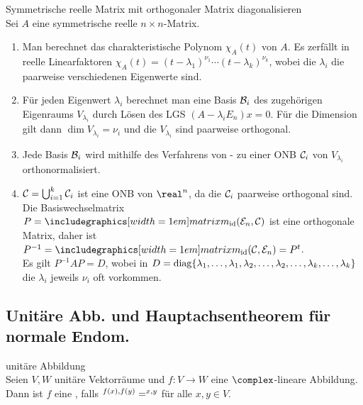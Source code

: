 \begin{Prozedur}%
{Symmetrische reelle Matrix mit orthogonaler Matrix diagonalisieren} \\
    Sei $A$ eine symmetrische reelle $n \times n$-Matrix.
    \begin{enumerate}
        \item Man berechnet das charakteristische Polynom $\chi_A(t)$ von $A$.
        Es zerfällt in reelle Linearfaktoren
        $\chi_A(t) = (t - \lambda_1)^{\nu_1} \cdots (t - \lambda_k)^{\nu_k}$,
        wobei die $\lambda_i$ die paarweise verschiedenen Eigenwerte sind.
        
        \item Für jeden Eigenwert $\lambda_i$ berechnet man eine Basis
        $\mathcal{B}_i$ des zugehörigen Eigenraums $V_{\lambda_i}$ durch Lösen
        des LGS $(A - \lambda_i E_n)x = 0$.
        Für die Dimension gilt dann $\dim V_{\lambda_i} = \nu_i$ und die
        $V_{\lambda_i}$ sind paarweise orthogonal.
        
        \item Jede Basis $\mathcal{B}_i$ wird mithilfe des Verfahrens
        von - zu einer ONB $\mathcal{C}_i$ von
        $V_{\lambda_i}$ orthonormalisiert.
        
        \item $\mathcal{C} = \bigcup_{i=1}^k \mathcal{C}_i$ ist eine ONB von
        $\real^n$, da die $\mathcal{C}_i$ paarweise orthogonal sind.
        Die Basiswechselmatrix $P = \matrixm_{\id}(\basis{E}_n, \basis{C})$
        ist eine orthogonale Matrix, daher ist
        $P^{-1} = \matrixm_{\id}(\basis{C}, \basis{E}_n) = P^t$. \\
        Es gilt $P^{-1} A P = D$, wobei in
        $D = \operatorname{diag}\{\lambda_1, \ldots, \lambda_1, \lambda_2, \ldots,
        \lambda_2, \ldots, \lambda_k, \ldots, \lambda_k\}$ die $\lambda_i$
        jeweils $\nu_i$ oft vorkommen.
    \end{enumerate}
\end{Prozedur}

\subsection{%
    Unitäre Abb. und Hauptachsentheorem für normale Endom.%
}

\begin{Def}{unitäre Abbildung} \\
    Seien $V, W$ unitäre Vektorräume und $f: V \rightarrow W$ eine
    $\complex$-lineare Abbildung. \\
    Dann ist $f$ eine , falls
    $\sp{f(x), f(y)} = \sp{x, y}$ für alle $x, y \in V$.
\end{Def}

